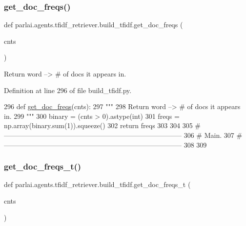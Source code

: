 \subsubsection{\texorpdfstring{get\+\_\+doc\+\_\+freqs()}{get\_doc\_freqs()}}
{\footnotesize\ttfamily def parlai.\+agents.\+tfidf\+\_\+retriever.\+build\+\_\+tfidf.\+get\+\_\+doc\+\_\+freqs (\begin{DoxyParamCaption}\item[{}]{cnts }\end{DoxyParamCaption})}

\begin{DoxyVerb}Return word --> # of docs it appears in.
\end{DoxyVerb}
 

Definition at line 296 of file build\+\_\+tfidf.\+py.


\begin{DoxyCode}
296 \textcolor{keyword}{def }\hyperlink{namespaceparlai_1_1agents_1_1tfidf__retriever_1_1build__tfidf_ac6883ed21006848661f6c748f91aff56}{get\_doc\_freqs}(cnts):
297     \textcolor{stringliteral}{"""}
298 \textcolor{stringliteral}{    Return word --> # of docs it appears in.}
299 \textcolor{stringliteral}{    """}
300     binary = (cnts > 0).astype(int)
301     freqs = np.array(binary.sum(1)).squeeze()
302     \textcolor{keywordflow}{return} freqs
303 
304 
305 \textcolor{comment}{# ------------------------------------------------------------------------------}
306 \textcolor{comment}{# Main.}
307 \textcolor{comment}{# ------------------------------------------------------------------------------}
308 
309 
\end{DoxyCode}
\mbox{\label{namespaceparlai_1_1agents_1_1tfidf__retriever_1_1build__tfidf_a284d006ecb031c337c64d7debe1407d3}} 
\subsubsection{\texorpdfstring{get\+\_\+doc\+\_\+freqs\+\_\+t()}{get\_doc\_freqs\_t()}}
{\footnotesize\ttfamily def parlai.\+agents.\+tfidf\+\_\+retriever.\+build\+\_\+tfidf.\+get\+\_\+doc\+\_\+freqs\+\_\+t (\begin{DoxyParamCaption}\item[{}]{cnts }\end{DoxyParamCaption})}

